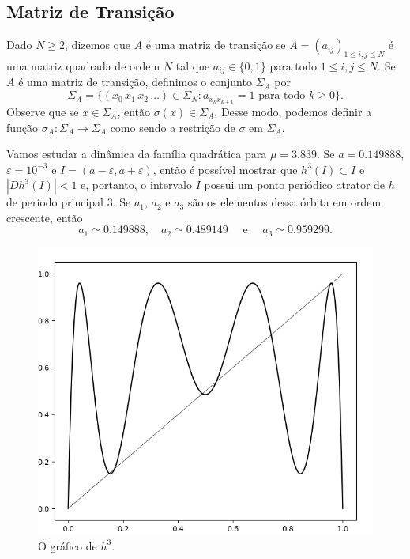 \subsection{Matriz de Transição}

Dado $N \geq 2$, dizemos que $A$ é uma matriz de transição se $A = (a_{ij})_{1 \leq i,j \leq N}$ é uma matriz quadrada de ordem $N$ tal que $a_{ij} \in \lbrace 0, 1 \rbrace$ para todo $1 \leq i,j \leq N$.
Se $A$ é uma matriz de transição, definimos o conjunto $\Sigma_A$ por
$$\Sigma_A = \lbrace (x_0 \, x_1 \, x_2 \, \dots) \in \Sigma_N : a_{x_k x_{k+1}} = 1 \text{ para todo } k \geq 0 \rbrace.$$
Observe que se $x \in \Sigma_A$, então $\sigma(x) \in \Sigma_A$.
Desse modo, podemos definir a função $\sigma_A: \Sigma_A \to \Sigma_A$ como sendo a restrição de $\sigma$ em $\Sigma_A$.

Vamos estudar a dinâmica da família quadrática para $\mu = 3.839$.
Se $a = 0.149888$, $\varepsilon = 10^{-3}$ e $I = (a - \varepsilon, a + \varepsilon)$, então é possível mostrar que $h^3(I) \subset I$ e $|D h^3(I)| < 1$ e, portanto, o intervalo $I$ possui um ponto periódico atrator de $h$ de período principal $3$. Se $a_1$, $a_2$ e $a_3$ são os elementos dessa órbita em ordem crescente, então
$$a_1 \simeq 0.149888, \quad a_2 \simeq 0.489149 \quad \text{ e } \quad a_3 \simeq 0.959299.$$

\begin{figure}[!htb]
\centering
\includegraphics[scale=0.3]{images/h_3,839.png}
\caption{O gráfico de $h^3$.}
\end{figure}

